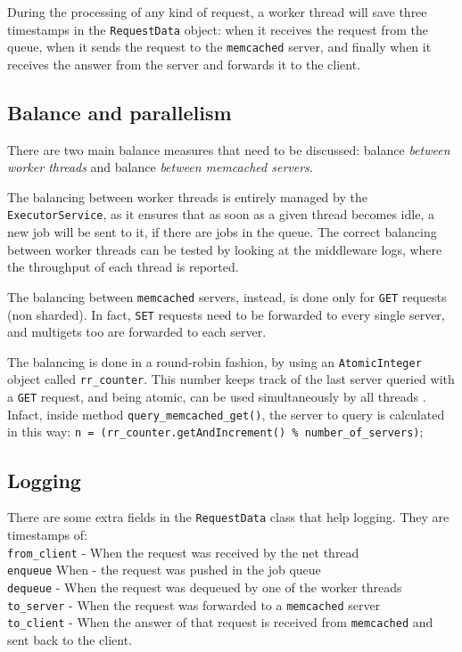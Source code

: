 \documentclass[11pt,a4paper]{article}
\renewcommand{\t}[1]{%
	{\texttt{#1}}}
\begin{document}
During the processing of any kind of request, a worker thread will save three timestamps in the
\t{RequestData} object: when it receives the request from the queue, when it
sends the request to the \t{memcached} server, and finally when it receives the
answer from the server and forwards it to the client.

\subsection{Balance and parallelism}

There are two main balance measures that need to be discussed: balance \emph{between worker threads} and balance \emph{between memcached servers}.

\vspace{1em}

The balancing between worker threads is entirely managed by the \t{ExecutorService}, as it ensures
that as soon as a given thread becomes idle, a new job will be sent to it, if there are jobs in the queue.
The correct balancing between worker threads can be tested by looking at the middleware logs, where the 
throughput of each thread is reported.

\vspace{1em}

The balancing between \t{memcached} servers, instead, is done only for \t{GET} requests (non sharded).
In fact, \t{SET} requests need to be forwarded to every single server, and multigets too are forwarded
to each server.

The balancing is done in a round-robin fashion, by using an \t{AtomicInteger} object called \t{rr\_counter}.
This number keeps track of the last server queried with a \t{GET} request, and being atomic, 
can be used simultaneously
by all threads . Infact, inside method \t{query\_memcached\_get()}, the server
to query is calculated in this way: \t{n = (rr\_counter.getAndIncrement() \% number\_of\_servers)}; 

\subsection{Logging}

There are some extra fields in the \t{RequestData} class that help logging. They are timestamps of:\\
	\t{from\_client} - When the request was received by the net thread \\
	\t{enqueue} When - the request was pushed in the job queue\\
	\t{dequeue} - When the request was dequeued by one of the worker threads\\
	\t{to\_server} - When the request was forwarded to a \t{memcached} server\\
	\t{to\_client} - When the answer of that request is received from \t{memcached} and sent back to the client.\\
\end{document}
